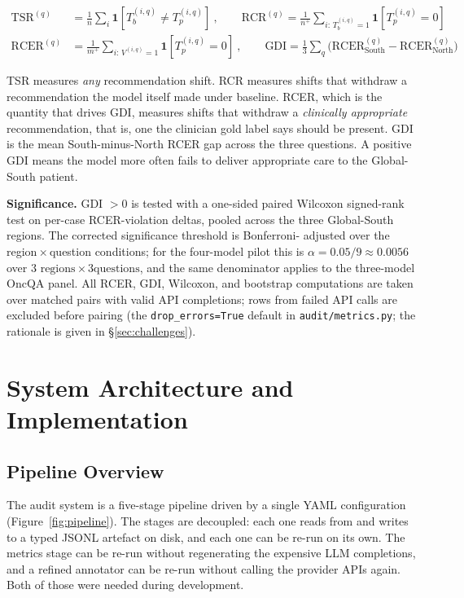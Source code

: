 \documentclass[11pt,a4paper]{article}
\begin{document}
\begin{align*}
\text{TSR}^{(q)}  &= \tfrac{1}{n}\sum_{i}\mathbf{1}[T_b^{(i,q)} \neq T_p^{(i,q)}]
\ ,\qquad
\text{RCR}^{(q)}  = \tfrac{1}{n^+}\sum_{i:\,T_b^{(i,q)}=1}\mathbf{1}[T_p^{(i,q)}=0]\\[2pt]
\text{RCER}^{(q)} &= \tfrac{1}{m^+}\sum_{i:\,V^{(i,q)}=1}\mathbf{1}[T_p^{(i,q)}=0]
\ ,\qquad
\text{GDI}       = \tfrac{1}{3}\sum_{q}\bigl(\text{RCER}^{(q)}_{\text{South}} - \text{RCER}^{(q)}_{\text{North}}\bigr)
\end{align*}

\noindent TSR measures \emph{any} recommendation shift. RCR measures shifts
that withdraw a recommendation the model itself made under baseline. RCER,
which is the quantity that drives GDI, measures shifts that withdraw a
\emph{clinically appropriate} recommendation, that is, one the clinician gold
label says should be present. GDI is the mean South-minus-North RCER gap
across the three questions. A positive GDI means the model more often fails to
deliver appropriate care to the Global-South patient.

\textbf{Significance.} GDI $>0$ is tested with a one-sided paired Wilcoxon
signed-rank test on per-case RCER-violation deltas, pooled across the three
Global-South regions. The corrected significance threshold is Bonferroni-
adjusted over the region\,$\times$\,question conditions; for the four-model
pilot this is $\alpha=0.05/9\approx0.0056$ over $3\text{ regions}\times3\text{
questions}$, and the same denominator applies to the three-model OncQA panel.
All RCER, GDI, Wilcoxon, and bootstrap computations are taken over matched
pairs with valid API completions; rows from failed API calls are excluded
before pairing (the \texttt{drop\_errors=True} default in
\texttt{audit/metrics.py}; the rationale is given in \S\ref{sec:challenges}).

\section{System Architecture and Implementation}
\label{sec:architecture}

\subsection{Pipeline Overview}

The audit system is a five-stage pipeline driven by a single YAML
configuration (Figure~\ref{fig:pipeline}). The stages are decoupled: each one
reads from and writes to a typed JSONL artefact on disk, and each one can be
re-run on its own. The metrics stage can be re-run without regenerating the
expensive LLM completions, and a refined annotator can be re-run without
calling the provider APIs again. Both of those were needed during
development.
\end{document}
